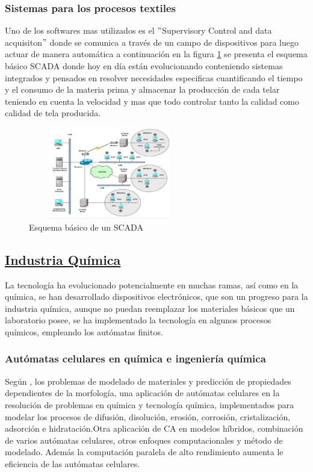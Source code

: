\documentclass[10pt,conference]{IEEEtran}
\begin{document}
\subsubsection{\textbf{Sistemas para los procesos textiles}}
Uno de los softwares mas utilizados es el $"$Supervisory Control and data acquisiton$"$ donde se comunica a través de un campo de dispositivos para luego actuar de manera automática a continuación en la figura \ref{Textil3} se presenta el esquema básico SCADA donde hoy en día están evolucionando conteniendo sistemas integrados y pensados en resolver necesidades especificas cuantificando el tiempo y el consumo de la materia prima y almacenar la producción de cada telar teniendo en cuenta la velocidad y mas que todo controlar tanto la calidad como calidad de tela producida.
\begin{figure}[H]
\centering
    \includegraphics[width=7cm, height=4cm]{Ind. Tetxil/text3.PNG}
 \caption{Esquema básico de un SCADA}
 \label{Textil3}
\end{figure}


\vspace{2.5mm}
\subsection{\underline{\textbf{Industria Química}}}
\vspace{2.5mm}
 La tecnología ha evolucionado potencialmente en muchas ramas, así como en la química, se han desarrollado dispositivos electrónicos, que son un progreso para la industria química, aunque no puedan reemplazar los materiales básicos que un laboratorio posee, se ha implementado la tecnología en algunos procesos químicos, empleando los autómatas finitos.

\subsubsection{\textbf{Autómatas celulares en química e ingeniería química}}
Según , los problemas de modelado de materiales y predicción de propiedades dependientes de la morfología, una aplicación de autómatas celulares en la resolución de problemas en química y tecnología química, implementados para modelar los procesos de difusión, disolución, erosión, corrosión, cristalización, adsorción e hidratación.Otra aplicación de CA en modelos híbridos, combinación de varios autómatas celulares, otros enfoques computacionales y método de modelado. Además la computación paralela de alto rendimiento aumenta le eficiencia de las autómatas celulares.
\end{document}
